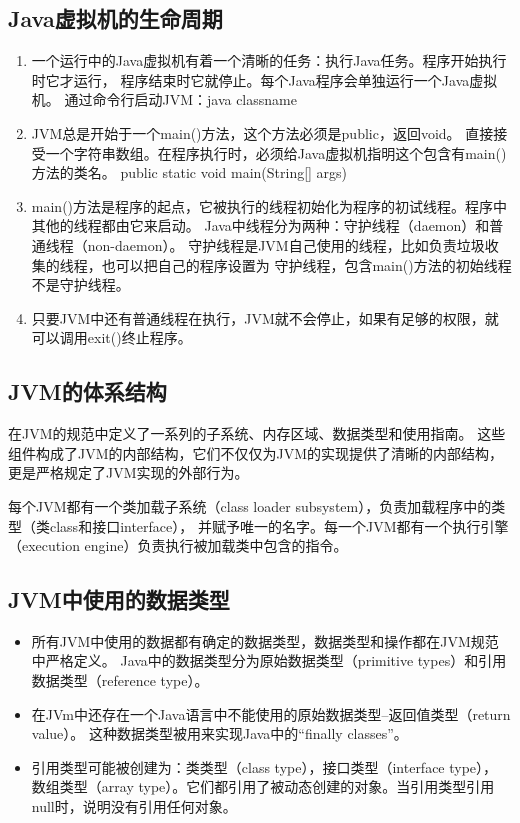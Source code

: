 \subsection{Java虚拟机的生命周期}
\begin{enumerate}
	\item 一个运行中的Java虚拟机有着一个清晰的任务：执行Java任务。程序开始执行时它才运行，
	程序结束时它就停止。每个Java程序会单独运行一个Java虚拟机。
	\subitem 通过命令行启动JVM：java classname
	\item JVM总是开始于一个main()方法，这个方法必须是public，返回void。
	直接接受一个字符串数组。在程序执行时，必须给Java虚拟机指明这个包含有main()方法的类名。
	\subitem public static void main(String[] args){}
	\item main()方法是程序的起点，它被执行的线程初始化为程序的初试线程。程序中其他的线程都由它来启动。
	Java中线程分为两种：守护线程（daemon）和普通线程（non-daemon）。
	\subitem 守护线程是JVM自己使用的线程，比如负责垃圾收集的线程，也可以把自己的程序设置为
	守护线程，包含main()方法的初始线程不是守护线程。
	\item 只要JVM中还有普通线程在执行，JVM就不会停止，如果有足够的权限，就可以调用exit()终止程序。
\end{enumerate}
\subsection{JVM的体系结构}
在JVM的规范中定义了一系列的子系统、内存区域、数据类型和使用指南。
这些组件构成了JVM的内部结构，它们不仅仅为JVM的实现提供了清晰的内部结构，
更是严格规定了JVM实现的外部行为。
\par 每个JVM都有一个类加载子系统（class loader subsystem），负责加载程序中的类型（类class和接口interface），
并赋予唯一的名字。每一个JVM都有一个执行引擎（execution engine）负责执行被加载类中包含的指令。
\subsection{JVM中使用的数据类型}
\begin{itemize}
	\item 所有JVM中使用的数据都有确定的数据类型，数据类型和操作都在JVM规范中严格定义。
	Java中的数据类型分为原始数据类型（primitive types）和引用数据类型（reference type）。
	\item 在JVm中还存在一个Java语言中不能使用的原始数据类型--返回值类型（return value）。
	这种数据类型被用来实现Java中的“finally classes”。
	\item 引用类型可能被创建为：类类型（class type），接口类型（interface type），
	数组类型（array type）。它们都引用了被动态创建的对象。当引用类型引用null时，说明没有引用任何对象。
\end{itemize}

